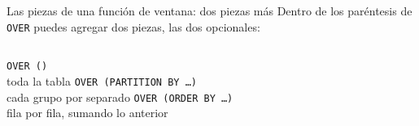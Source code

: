 \documentclass[aspectratio=169,10pt,c]{beamer}
\newcommand{\kw}[1]{\textcolor{utpRojo}{\textbf{#1}}}
\newcommand{\gris}[1]{\textcolor{utpGris}{#1}}
\newcommand{\dentro}[1]{{\setlength{\fboxsep}{1.5pt}\colorbox{yellow!45}{#1}}}
\newcommand{\ind}{\hspace*{1.2em}}
\newcommand{\piezax}{7.6}
\newcommand{\pieza}[3]{%
  \node[pieza] at (0,#1) {#2};
  \node[para] at (\piezax,#1) {\textcolor{utpRojo}{$\blacktriangleleft$}\ #3};}
\begin{document}
\begin{frame}{Las piezas de una función de ventana: dos piezas más}
\small Dentro de los paréntesis de \texttt{OVER} puedes agregar dos piezas, las dos opcionales:
\vspace{0.3cm}
\begin{center}
\renewcommand{\piezax}{6.4}
\end{center}
\vspace{0.3cm}
\begin{columns}[c,onlytextwidth]
\centering\texttt{OVER ()}\\[3pt]\footnotesize toda la tabla
\centering\texttt{OVER (PARTITION BY \ldots)}\\[3pt]\footnotesize cada grupo por separado
\centering\texttt{OVER (ORDER BY \ldots)}\\[3pt]\footnotesize fila por fila, sumando lo anterior
\end{columns}
\end{frame}
\end{document}
